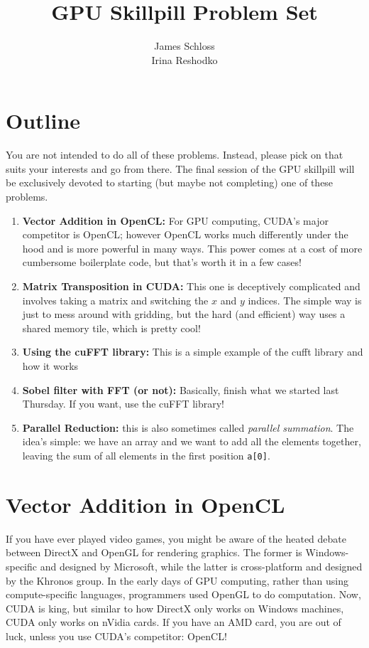 \documentclass[11pt]{article}
\title{\textbf{GPU Skillpill Problem Set}}
\author{James Schloss\\
		Irina Reshodko}
\date{}
\begin{document}
\maketitle

\section*{Outline}

You are not intended to do all of these problems. Instead, please pick on that suits your interests and go from there. The final session of the GPU skillpill will be exclusively devoted to starting (but maybe not completing) one of these problems.

\begin{enumerate}
\item \textbf{Vector Addition in OpenCL:} For GPU computing, CUDA's major competitor is OpenCL; however OpenCL works much differently under the hood and is more powerful in many ways. This power comes at a cost of more cumbersome boilerplate code, but that's worth it in a few cases!
\item \textbf{Matrix Transposition in CUDA:} This one is deceptively complicated and involves taking a matrix and switching the $x$ and $y$ indices. The simple way is just to mess around with gridding, but the hard (and efficient) way uses a shared memory tile, which is pretty cool!
\item \textbf{Using the cuFFT library:} This is a simple example of the cufft library and how it works
\item \textbf{Sobel filter with FFT (or not):} Basically, finish what we started last Thursday. If you want, use the cuFFT library!
\item \textbf{Parallel Reduction:} this is also sometimes called \textit{parallel summation}. The idea's simple: we have an array and we want to add all the elements together, leaving the sum of all elements in the first position \lstinline{a[0]}.
\end{enumerate}

\newpage
\section*{Vector Addition in OpenCL}
If you have ever played video games, you might be aware of the heated debate between DirectX and OpenGL for rendering graphics. 
The former is Windows-specific and designed by Microsoft, while the latter is cross-platform and designed by the Khronos group. 
In the early days of GPU computing, rather than using compute-specific languages, programmers used OpenGL to do computation. 
Now, CUDA is king, but similar to how DirectX only works on Windows machines, CUDA only works on nVidia cards. 
If you have an AMD card, you are out of luck, unless you use CUDA's competitor: OpenCL!
\end{document}
